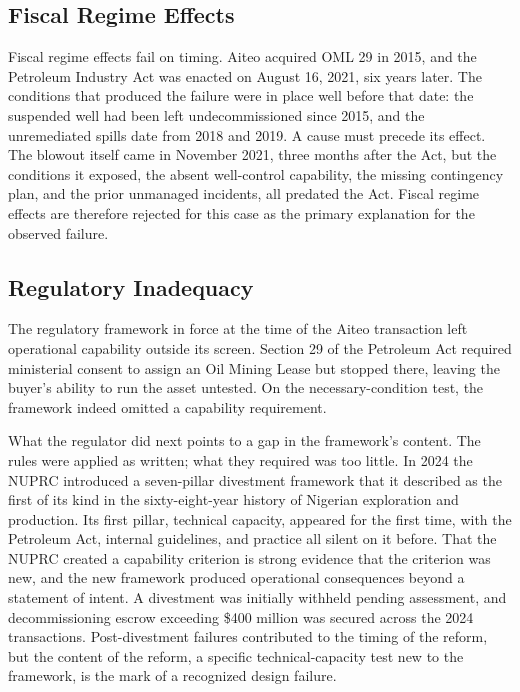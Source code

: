 \hypertarget{fiscal-regime-effects}{%
\subsection{Fiscal Regime Effects}\label{fiscal-regime-effects}}

Fiscal regime effects fail on timing. Aiteo acquired OML 29 in 2015, and
the Petroleum Industry Act was enacted on August 16, 2021, six years
later. The conditions that produced the failure were in place well
before that date: the suspended well had been left undecommissioned
since 2015, and the unremediated spills date from 2018 and 2019. A cause
must precede its effect. The blowout itself came in November 2021, three
months after the Act, but the conditions it exposed, the absent
well-control capability, the missing contingency plan, and the prior
unmanaged incidents, all predated the Act. Fiscal regime effects are
therefore rejected for this case as the primary explanation for the
observed failure.

\hypertarget{regulatory-inadequacy}{%
\subsection{Regulatory Inadequacy}\label{regulatory-inadequacy}}

The regulatory framework in force at the time of the Aiteo transaction
left operational capability outside its screen. Section 29 of the
Petroleum Act required ministerial consent to assign an Oil Mining Lease
but stopped there, leaving the buyer's ability to run the asset
untested. On the necessary-condition test, the framework indeed omitted
a capability requirement.

What the regulator did next points to a gap in the framework's content.
The rules were applied as written; what they required was too little. In
2024 the NUPRC introduced a seven-pillar divestment framework that it
described as the first of its kind in the sixty-eight-year history of
Nigerian exploration and production. Its first pillar, technical
capacity, appeared for the first time, with the Petroleum Act, internal
guidelines, and practice all silent on it before. That the NUPRC created
a capability criterion is strong evidence that the criterion was new,
and the new framework produced operational consequences beyond a
statement of intent. A divestment was initially withheld pending
assessment, and decommissioning escrow exceeding \$400 million was
secured across the 2024 transactions. Post-divestment failures
contributed to the timing of the reform, but the content of the reform,
a specific technical-capacity test new to the framework, is the mark of
a recognized design failure.

